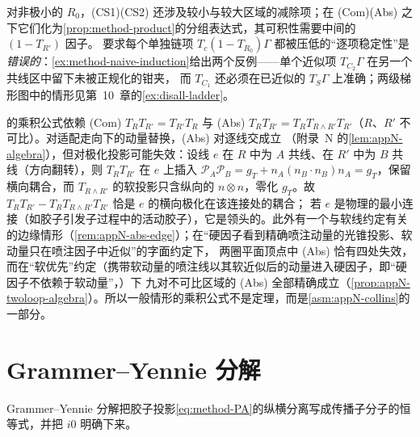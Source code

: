 对非极小的 $R_0$，(CS1)(CS2) 还涉及较小与较大区域的减除项；在 (Com)(Abs) 之下它们化为\cref{prop:method-product}的分组表达式，其可积性需要中间的 $(1-T_{R'})$ 因子。
要求每个单独链项 $T_c(1-T_{R_0})\Gamma$ 都被压低的“逐项稳定性”是\emph{错误的}：\cref{ex:method-naive-induction}给出两个反例——单个近似项 $T_{C_2}\Gamma$ 在另一个共线区中留下未被正规化的钳夹，
而 $T_{C_1}$ 还必须在已近似的 $T_S\Gamma$ 上准确；两级梯形图中的情形见第~10~章的\cref{ex:disall-ladder}。

\begin{remark}\label{rem:method-abs-failure}
的乘积公式依赖 (Com) $T_RT_{R'}=T_{R'}T_R$ 与 (Abs) $T_RT_{R'}=T_RT_{R\wedge R'}T_{R'}$（$R$、$R'$ 不可比）。对适配走向下的动量替换，(Abs) 对逐线交成立
（附录~N 的\cref{lem:appN-algebra}），但对极化投影可能失效：设线 $e$ 在 $R$ 中为 $A$ 共线、在 $R'$ 中为 $B$ 共线（方向翻转），则 $T_RT_{R'}$ 在 $e$ 上插入
$\mathcal P_A\mathcal P_B=g_T+n_A(n_B\cdot n_B)n_A=g_T$，保留横向耦合，而 $T_{R\wedge R'}$ 的软投影只含纵向的 $n\otimes n$，零化 $g_T$。故 $T_RT_{R'}-T_RT_{R\wedge R'}T_{R'}$ 恰是 $e$ 的横向极化在该连接处的耦合；
若 $e$ 是物理的最小连接（如胶子引发子过程中的活动胶子），它是领头的。此外有一个与软线约定有关的边缘情形（\cref{rem:appN-abs-edge}）；在“硬因子看到精确喷注动量的光锥投影、软动量只在喷注因子中近似”的字面约定下，
两圈平面顶点中 (Abs) 恰有四处失效，而在“软优先”约定（携带软动量的喷注线以其软近似后的动量进入硬因子，即“硬因子不依赖于软动量”，\cite[第~10.6.6~节]{Collins2011}）下
九对不可比区域的 (Abs) 全部精确成立（\cref{prop:appN-twoloop-algebra}）。所以一般情形的乘积公式不是定理，而是\cref{asm:appN-collins}的一部分。
\end{remark}

\section{Grammer--Yennie 分解}\label{sec:method-gy}

Grammer--Yennie 分解把胶子投影\cref{eq:method-PA}的纵横分离写成传播子分子的恒等式，并把 $i0$ 明确下来。

